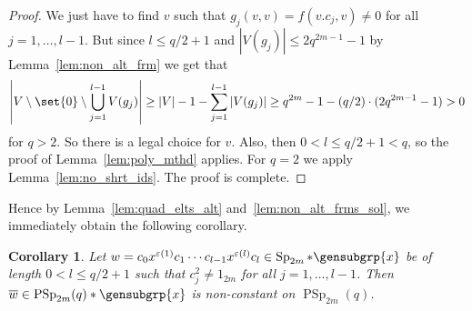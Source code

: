 \documentclass[a4paper,11pt]{amsproc}
\newcommand{\card}[1]{\left\lvert#1\right\rvert}%
\DeclareMathOperator{\Sp}{Sp}%
\DeclareMathOperator{\PSp}{PSp}%
\theoremstyle{plain}
\newtheorem{corollary}[lemma]{Corollary}
\theoremstyle{definition}
\begin{document}
	\begin{proof}
		We just have to find $v$ such that $g_j(v,v)=f(v.c_j,v)\neq 0$ for all $j=1,\ldots,l-1$. But since $l\leq q/2+1$ and $\card{V(g_j)}\leq 2 q^{2m-1}-1$ by Lemma~\ref{lem:non_alt_frm} we get that 
		$$
		\card{V\setminus\set{0}\setminus\bigcup_{j=1}^{l-1}{V(g_j)}}\geq \card{V}-1-\sum_{j=1}^{l-1}{\card{V(g_j)}}\geq q^{2m}-1-(q/2)\cdot(2 q^{2m-1}-1)>0
		$$
		for $q>2$. So there is a legal choice for $v$. Also, then $0<l\leq q/2+1<q$, so the proof of Lemma~\ref{lem:poly_mthd} applies. For $q=2$ we apply Lemma~\ref{lem:no_shrt_ids}. The proof is complete.
	\end{proof}
	
	Hence by Lemma~\ref{lem:quad_elts_alt} and~\ref{lem:non_alt_frms_sol}, we immediately obtain the following corollary.
	
	\begin{corollary}\label{cor:non_quad_elts_sol}
		Let $w=c_0x^{\varepsilon(1)}c_1\cdots c_{l-1}x^{\varepsilon(l)}c_l\in\Sp_{2m}\ast\gensubgrp{x}$ be of length $0<l\leq q/2+1$ such that $c_j^2\neq 1_{2m}$ for all $j=1,\ldots,l-1$. Then $\overline{w}\in\PSp_{2m}(q)\ast\gensubgrp{x}$ is non-constant on $\PSp_{2m}(q)$.
	\end{corollary}
	
\end{document}
